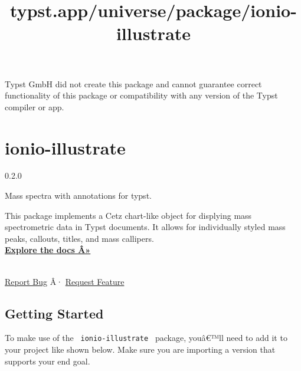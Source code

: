 Typst GmbH did not create this package and cannot guarantee correct
functionality of this package or compatibility with any version of the
Typst compiler or app.


\title{typst.app/universe/package/ionio-illustrate}

\label{banner}
\section{ionio-illustrate}\label{ionio-illustrate}

{ 0.2.0 }

Mass spectra with annotations for typst.

\label{readme}
\label{readme-top}{}

\href{https://github.com/jamesxx/ionio-illustrate/blob/master/LICENSE}{}
\href{https://github.com/typst/packages/tree/main/packages/preview/ionio-illustrate}{}
\href{https://github.com/JamesxX/ionio-illustrate/tags}{}

This package implements a Cetz chart-like object for displying mass
spectrometric data in Typst documents. It allows for individually styled
mass peaks, callouts, titles, and mass callipers.\\

\href{https://github.com/jamesxx/ionio-illustrate/blob/main/manual.pdf}{\textbf{Explore
the docs Â»}}\\
\strut \\
\href{https://github.com/jamesxx/ionio-illustrate/issues}{Report Bug} Â·
\href{https://github.com/jamesxx/ionio-illustrate/issues}{Request
Feature}

\subsection{Getting Started}\label{getting-started}

To make use of the \texttt{\ ionio-illustrate\ } package, youâ€™ll need
to add it to your project like shown below. Make sure you are importing
a version that supports your end goal.

\begin{Shaded}
\begin{Highlighting}[]
\end{Highlighting}
\end{Shaded}


